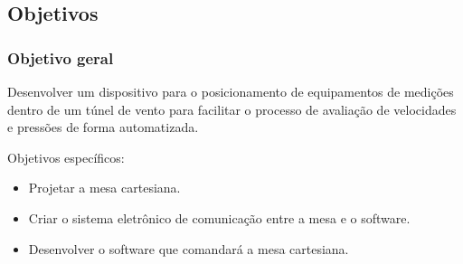 \subsection{Objetivos}

\begin{frame}
\frametitle{Objetivo geral}

Desenvolver um dispositivo para o posicionamento de equipamentos de medições dentro de um túnel de vento para facilitar o processo de avaliação de velocidades e pressões de forma automatizada.

Objetivos específicos:
\begin{itemize}
    \item Projetar a mesa cartesiana.
    \item Criar o sistema eletrônico de comunicação entre a mesa e o software.
    \item Desenvolver o software que comandará a mesa cartesiana.
\end{itemize}

\end{frame}

